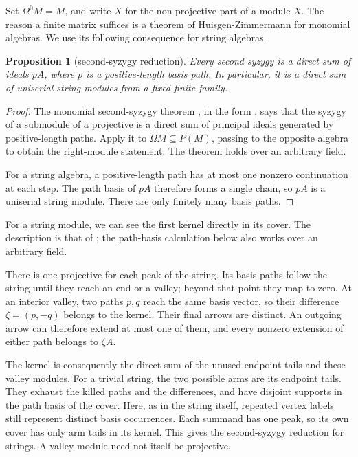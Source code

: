 \documentclass[reqno]{amsart}
\makeatletter
\def\subsection{\@startsection{subsection}{3}\z@{.8\linespacing\@plus.7\linespacing}{.5\linespacing}{\normalfont\bfseries \centering}}
\numberwithin{equation}{section}
\newtheorem{proposition}[theorem]{Proposition}
\theoremstyle{definition}
\theoremstyle{remark}
\newcommand{\Om}{\Omega}
\makeatother
\begin{document}
\subsection{Reduction after two syzygies}
Set \(\Om^0M=M\), and write \(\underline X\) for the non-projective part of a module \(X\). The reason a finite matrix suffices is a theorem of Huisgen-Zimmermann for monomial algebras. We use its following consequence for string algebras.

\begin{proposition}[second-syzygy reduction]\label{prop:reduction}
Every second syzygy is a direct sum of ideals \(pA\), where \(p\) is a positive-length basis path. In particular, it is a direct sum of uniserial string modules from a fixed finite family.
\end{proposition}
\begin{proof}
The monomial second-syzygy theorem \cite[Theorem~I]{HZ}, in the form \cite[Theorem~A(1)]{HZDomino}, says that the syzygy of a submodule of a projective is a direct sum of principal ideals generated by positive-length paths. Apply it to \(\Om M\subseteq P(M)\), passing to the opposite algebra to obtain the right-module statement. The theorem holds over an arbitrary field.

For a string algebra, a positive-length path has at most one nonzero continuation at each step. The path basis of \(pA\) therefore forms a single chain, so \(pA\) is a uniserial string module. There are only finitely many basis paths.
\end{proof}

For a string module, we can see the first kernel directly in its cover. The description is that of \cite[Proposition~1(1)(a)]{HZS}; the path-basis calculation below also works over an arbitrary field.

There is one projective for each peak of the string. Its basis paths follow the string until they reach an end or a valley; beyond that point they map to zero. At an interior valley, two paths \(p,q\) reach the same basis vector, so their difference \(\zeta=(p,-q)\) belongs to the kernel. Their final arrows are distinct. An outgoing arrow can therefore extend at most one of them, and every nonzero extension of either path belongs to \(\zeta A\).

The kernel is consequently the direct sum of the unused endpoint tails and these valley modules. For a trivial string, the two possible arms are its endpoint tails. They exhaust the killed paths and the differences, and have disjoint supports in the path basis of the cover. Here, as in the string itself, repeated vertex labels still represent distinct basis occurrences. Each summand has one peak, so its own cover has only arm tails in its kernel. This gives the second-syzygy reduction for strings. A valley module need not itself be projective.
\end{document}
